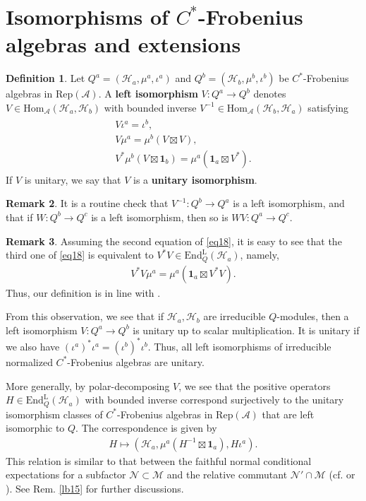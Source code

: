 \documentclass[11pt,b5paper,notitlepage]{article}
\theoremstyle{definition}
\newtheorem{df}{Definition}[section]
\newtheorem{rem}[df]{Remark}
\theoremstyle{plain}
\newcommand{\mc}{\mathcal}
\newcommand{\id}{\mathbf{1}}
\newcommand{\Hom}{\mathrm{Hom}}
\newcommand{\Rep}{\mathrm{Rep}}
\newcommand{\RepA}{\mathrm{Rep}(\mathcal A)}
\newcommand{\EndL}{\mathrm{End}^{\mathrm{L}}}
\numberwithin{equation}{section}
\begin{document}
\section{Isomorphisms of $C^*$-Frobenius algebras and extensions}

\begin{df}\label{lb8}
Let $Q^a=(\mc H_a,\mu^a,\iota^a)$ and $Q^b=(\mc H_b,\mu^b,\iota^b)$ be $C^*$-Frobenius algebras in $\RepA$. A \textbf{left isomorphism} $V:Q^a\rightarrow Q^b$ denotes  $V\in\Hom_{\mc A}(\mc H_a,\mc H_b)$ with bounded inverse $V^{-1}\in\Hom_{\mc A}(\mc H_b,\mc H_a)$ satisfying
\begin{gather}\label{eq18}
	\begin{gathered}
V\iota^a=\iota^b,\\
V\mu^a=\mu^b(V\boxtimes V),\\
V^*\mu^b(V\boxtimes \id_b)=\mu^a(\id_a\boxtimes V^*).
	\end{gathered}
\end{gather}
If $V$ is unitary, we say that $V$ is a \textbf{unitary isomorphism}.
\end{df}

\begin{rem}\label{lb9}
It is a routine check that $V^{-1}:Q^b\rightarrow Q^a$ is a left isomorphism, and that if $W:Q^b\rightarrow Q^c$ is a left isomorphism, then so is $WV:Q^a\rightarrow Q^c$. 
\end{rem}



\begin{rem}
Assuming the second equation of \eqref{eq18}, it is easy to see that the third one of \eqref{eq18} is equivalent to $V^*V\in\EndL_Q(\mc H_a)$, namely,
\begin{align}
V^*V\mu ^a=\mu^a(\id_a\boxtimes V^*V).	
\end{align}
Thus, our definition is in line with \cite[Def. 2.4]{NY18}.

From this observation, we see that if $\mc H_a,\mc H_b$  are irreducible $Q$-modules, then a left isomorphism $V:Q^a\rightarrow Q^b$ is unitary up  to scalar multiplication. It is unitary if we also have $(\iota^a)^*\iota^a=(\iota^b)^*\iota^b$. Thus, all left isomorphisms of irreducible normalized $C^*$-Frobenius algebras are unitary. 

More generally, by polar-decomposing $V$, we see that the  positive operators $H\in\EndL_Q(\mc H_a)$ with bounded inverse correspond surjectively to the unitary isomorphism classes of $C^*$-Frobenius algebras in $\Rep(\mc A)$ that are left isomorphic to $Q$. The correspondence is given by
\begin{align}
H\mapsto (\mc H_a,\mu^a(H^{-1}\boxtimes\id_a),H\iota^a).	
\end{align}
This relation is similar to that between the  faithful normal conditional expectations for a subfactor $\mc N\subset\mc M$ and the relative commutant $\mc N'\cap \mc M$ (cf. \cite{CD75} or \cite[Sec. A.3]{Kos98}). See Rem. \ref{lb15} for further discussions.
\end{rem}
\end{document}
